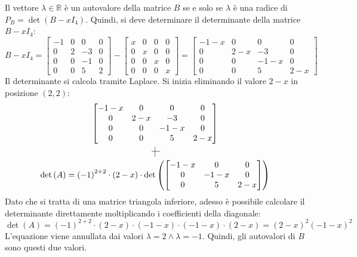 \documentclass[a4paper]{article}
\makeatletter
\newcommand{\MyTikzmark}[2]{%
	\tikz[overlay,remember picture,baseline] \node [anchor=base] (#1) {#2};%
}
\newcommand{\DrawVLine}[3][]{%
	\begin{tikzpicture}[overlay,remember picture]
		\draw[shorten <=0.3ex, #1] (#2.north) -- (#3.south);
	\end{tikzpicture}
}
\newcommand{\DrawHLine}[3][]{%
	\begin{tikzpicture}[overlay,remember picture]
		\draw[shorten <=0.2em, #1] (#2.west) -- (#3.east);
	\end{tikzpicture}
}
\newenvironment{rowequmatbra}[1]{\left[\array{@{}#1@{}}}{\endarray\right]}
\makeatother
\begin{document}
	\noindent
	Il vettore $\lambda \in \mathbb{R}$ è un autovalore della matrice $B$ se e solo se $\lambda$ è una radice di $P_{B} = \det\left(B - xI_{4}\right)$. Quindi, si deve determinare il determinante della matrice $B-xI_{4}$:
	\begin{equation*}
		B-xI_{4} = \begin{bmatrix}
			-1 & 0 & 0 & 0 	\\
			0 & 2 & -3 & 0 	\\
			0 & 0 & -1 & 0 	\\
			0 & 0 & 5 & 2
		\end{bmatrix} - \begin{bmatrix}
			x & 0 & 0 & 0 	\\
			0 & x & 0 & 0 	\\
			0 & 0 & x & 0 	\\
			0 & 0 & 0 & x
		\end{bmatrix} = \begin{bmatrix}
			-1-x & 0 & 0 & 0 	\\
			0 & 2-x & -3 & 0 	\\
			0 & 0 & -1-x & 0 	\\
			0 & 0 & 5 & 2-x
		\end{bmatrix}
	\end{equation*}
	Il determinante si calcola tramite Laplace. Si inizia eliminando il valore $2-x$ in posizione $\left(2,2\right)$:
	\begin{gather*}
		\begin{rowequmatbra}{cccc}
			-1-x & \MyTikzmark{s_col}{0} & 0 & 0 \\
			\MyTikzmark{s_row}{0} & 2-x & -3 & \MyTikzmark{e_row}{0} \\
			0 & 0 & -1-x & 0 \\
			0 & \MyTikzmark{e_col}{0} & 5 & 2-x
		\end{rowequmatbra} \\
		\DrawHLine{s_row}{e_row}
		\DrawVLine{s_col}{e_col}
		\\
		\det\left(A\right) = \left(-1\right)^{2+2} \cdot \left(2-x\right) \cdot \det\left(
		\begin{rowequmatbra}{ccc}
			-1-x & 0 & 0 	\\
			0 & -1-x & 0 	\\
			0 & 5 & 2-x
		\end{rowequmatbra}\right)
	\end{gather*}
	Dato che si tratta di una matrice triangola inferiore, adesso è possibile calcolare il determinante direttamente moltiplicando i coefficienti della diagonale:
	\begin{equation*}
		\det\left(A\right) = \left(-1\right)^{2+2} \cdot \left(2-x\right) \cdot \left(-1-x\right) \cdot \left(-1-x\right) \cdot \left(2-x\right) = \left(2-x\right)^{2}\left(-1-x\right)^{2}
	\end{equation*}
	L'equazione viene annullata dai valori $\lambda = 2 \land \lambda = -1$. Quindi, gli autovalori di $B$ sono questi due valori.\newline
	
\end{document}
